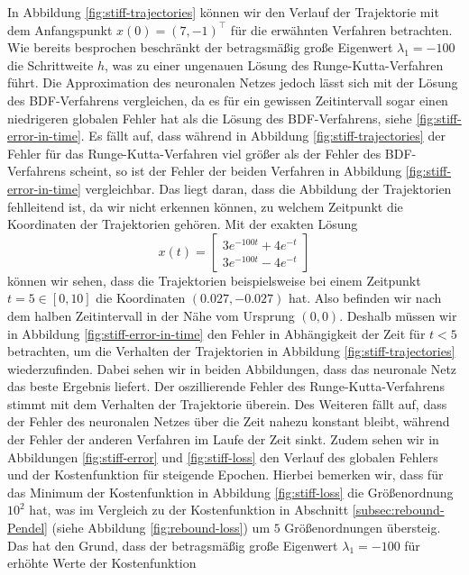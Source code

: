 In Abbildung \ref{fig:stiff-trajectories} können wir den Verlauf der Trajektorie mit dem Anfangspunkt
$x(0)=(7,-1)^{\intercal}$ für die erwähnten Verfahren betrachten. Wie bereits besprochen beschränkt der betragsmäßig große
Eigenwert $\lambda_1=-100$ die Schrittweite $h$, was zu einer ungenauen Lösung des Runge-Kutta-Verfahren führt. Die
Approximation des neuronalen Netzes jedoch lässt sich mit der Lösung des BDF-Verfahrens vergleichen, da es für ein
gewissen Zeitintervall sogar einen niedrigeren globalen Fehler hat als die Lösung des BDF-Verfahrens, siehe
\ref{fig:stiff-error-in-time}. Es fällt auf, dass während in Abbildung \ref{fig:stiff-trajectories} der Fehler für das
Runge-Kutta-Verfahren viel größer als der Fehler des BDF-Verfahrens scheint, so ist der Fehler der beiden Verfahren in
Abbildung \ref{fig:stiff-error-in-time} vergleichbar. Das liegt daran, dass die Abbildung der Trajektorien fehlleitend
ist, da wir nicht erkennen können, zu welchem Zeitpunkt die Koordinaten der Trajektorien gehören. Mit der exakten Lösung
\[
       x(t) = \begin{bmatrix*} 3 e^{-100 t} + 4 e^{- t} \\
              3 e^{-100 t} - 4 e^{-t} \end{bmatrix*}
\]
können wir sehen, dass die Trajektorien beispielsweise bei einem Zeitpunkt $t=5 \in [0, 10]$ die Koordinaten
$(0.027, -0.027)$ hat. Also befinden wir nach dem halben Zeitintervall in der Nähe vom Ursprung $(0,0)$. Deshalb müssen
wir in Abbildung \ref{fig:stiff-error-in-time} den Fehler in Abhängigkeit der Zeit für $t<5$ betrachten, um die
Verhalten der Trajektorien in Abbildung \ref{fig:stiff-trajectories} wiederzufinden. Dabei sehen wir in beiden
Abbildungen, dass das neuronale Netz das beste Ergebnis liefert.
Der oszillierende Fehler des Runge-Kutta-Verfahrens stimmt mit dem Verhalten der Trajektorie überein. Des Weiteren fällt
auf, dass der Fehler des neuronalen Netzes über die Zeit nahezu konstant bleibt, während der Fehler der anderen
Verfahren im Laufe der Zeit sinkt. Zudem sehen wir in Abbildungen \ref{fig:stiff-error} und \ref{fig:stiff-loss} den
Verlauf des globalen Fehlers und der Kostenfunktion für steigende Epochen. Hierbei bemerken wir, dass für das Minimum
der Kostenfunktion in Abbildung \ref{fig:stiff-loss} die Größenordnung $10^2$ hat, was im Vergleich zu der
Kostenfunktion in Abschnitt \ref{subsec:rebound-Pendel} (siehe Abbildung \ref{fig:rebound-loss}) um $5$ Größenordnungen
übersteig. Das hat den Grund, dass der betragsmäßig große Eigenwert $\lambda_1=-100$ für erhöhte Werte der Kostenfunktion
